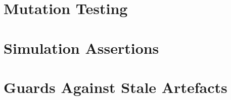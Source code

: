 \section{Mutation Testing}
\label{sec:mutation}

\section{Simulation Assertions}
\label{sec:assertions}

\section{Guards Against Stale Artefacts}
\label{sec:guards}

